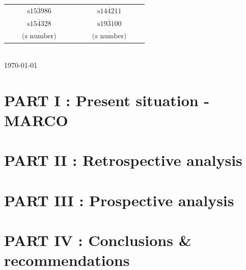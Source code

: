 \documentclass[12pt]{article}
\begin{document}
\begin{titlepage}
{
}


\begin{tabular}{cc}
 $\overline{\qquad\text{s153986}\qquad}$ \quad& \quad
 $\overline{\qquad\text{s144211}\qquad}$ \\ [1cm]
 $\overline{\qquad\text{s154328}\qquad}$ \quad& \quad
 $\overline{\qquad\text{s193100}\qquad}$ \\[1cm]
  $\overline{\qquad\text{(s number)}\qquad}$ \quad& \quad
 $\overline{\qquad\text{(s number)}\qquad}$ \\
\end{tabular}\\[1cm]

{\small
\today %
}
\\[0.2cm] %



\end{titlepage}

\newpage
\tableofcontents

\newpage
\section{PART I : Present situation - MARCO}



\section{PART II : Retrospective analysis}



\section{PART III : Prospective analysis}



\section{PART IV : Conclusions \& recommendations}



\newpage


\end{document}
